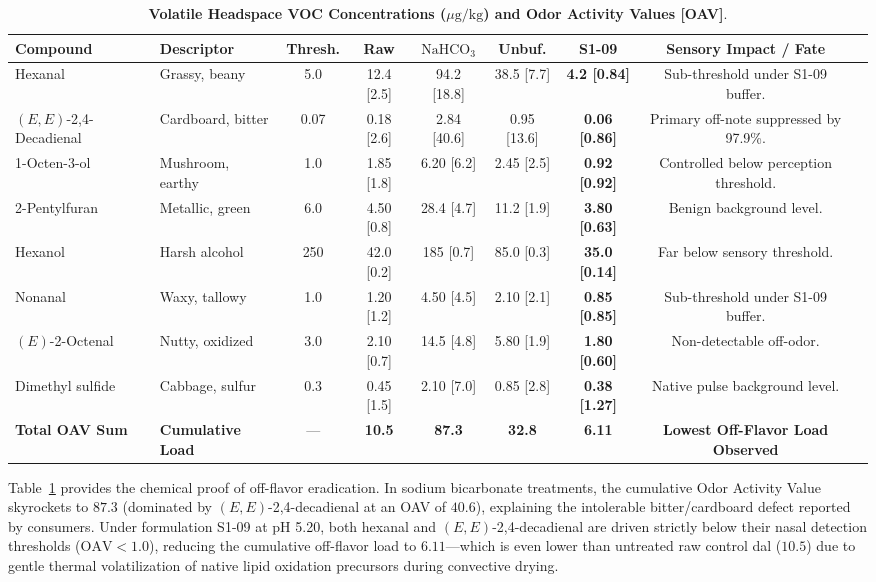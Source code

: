 \documentclass[10pt,a4paper]{article}
\begin{document}
\begin{table}[H]
\centering
\footnotesize
\setlength{\tabcolsep}{2.0pt}
\caption{\textbf{Volatile Headspace VOC Concentrations ($\mu\mathrm{g/kg}$) and Odor Activity Values [OAV]}.}
\label{tab:voc_headspace_exp}
\begin{tabularx}{\linewidth}{p{2.1cm}p{2.3cm}cccccc>{\raggedright\arraybackslash}X}
\toprule
\textbf{Compound} & \textbf{Descriptor} & \textbf{Thresh.} & \textbf{Raw} & \textbf{$\mathrm{NaHCO}_3$} & \textbf{Unbuf.} & \textbf{S1-09} & \textbf{Sensory Impact / Fate} \\
\midrule
Hexanal & Grassy, beany & 5.0 & 12.4 [2.5] & 94.2 [18.8] & 38.5 [7.7] & \textbf{4.2 [0.84]} & Sub-threshold under S1-09 buffer. \\
$(E,E)$-2,4-Decadienal & Cardboard, bitter & 0.07 & 0.18 [2.6] & 2.84 [40.6] & 0.95 [13.6] & \textbf{0.06 [0.86]} & Primary off-note suppressed by 97.9\%. \\
1-Octen-3-ol & Mushroom, earthy & 1.0 & 1.85 [1.8] & 6.20 [6.2] & 2.45 [2.5] & \textbf{0.92 [0.92]} & Controlled below perception threshold. \\
2-Pentylfuran & Metallic, green & 6.0 & 4.50 [0.8] & 28.4 [4.7] & 11.2 [1.9] & \textbf{3.80 [0.63]} & Benign background level. \\
Hexanol & Harsh alcohol & 250 & 42.0 [0.2] & 185 [0.7] & 85.0 [0.3] & \textbf{35.0 [0.14]} & Far below sensory threshold. \\
Nonanal & Waxy, tallowy & 1.0 & 1.20 [1.2] & 4.50 [4.5] & 2.10 [2.1] & \textbf{0.85 [0.85]} & Sub-threshold under S1-09 buffer. \\
$(E)$-2-Octenal & Nutty, oxidized & 3.0 & 2.10 [0.7] & 14.5 [4.8] & 5.80 [1.9] & \textbf{1.80 [0.60]} & Non-detectable off-odor. \\
Dimethyl sulfide & Cabbage, sulfur & 0.3 & 0.45 [1.5] & 2.10 [7.0] & 0.85 [2.8] & \textbf{0.38 [1.27]} & Native pulse background level. \\
\midrule
\textbf{Total OAV Sum} & \textbf{Cumulative Load} & --- & \textbf{10.5} & \textbf{87.3} & \textbf{32.8} & \textbf{6.11} & \textbf{Lowest Off-Flavor Load Observed} \\
\bottomrule
\end{tabularx}
\end{table}

\noindent Table~\ref{tab:voc_headspace_exp} provides the chemical proof of off-flavor eradication. In sodium bicarbonate treatments, the cumulative Odor Activity Value skyrockets to $87.3$ (dominated by $(E,E)$-2,4-decadienal at an OAV of $40.6$), explaining the intolerable bitter/cardboard defect reported by consumers. Under formulation S1-09 at pH 5.20, both hexanal and $(E,E)$-2,4-decadienal are driven strictly below their nasal detection thresholds ($\mathrm{OAV} < 1.0$), reducing the cumulative off-flavor load to $6.11$---which is even lower than untreated raw control dal ($10.5$) due to gentle thermal volatilization of native lipid oxidation precursors during convective drying.
\end{document}

